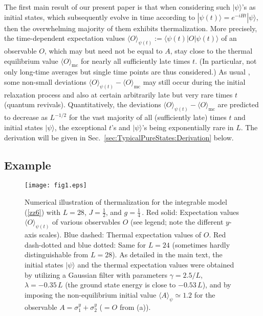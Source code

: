 \documentclass[twocolumn,aps,prb,floatfix,superscriptaddress]{revtex4-2}
\newcommand{\<}{\left\langle}	%
\renewcommand{\>}{\right\rangle}	%
\newcommand{\Omc}{\langle O\rangle_{\!\mathrm{mc}}}
\begin{document}
The first main result of our present paper is that
when considering such $|\psi\rangle$'s as initial 
states, which subsequently evolve in time according to 
$|\psi(t)\rangle=e^{-iHt}|\psi\rangle$,
then the overwhelming majority of them exhibits thermalization.
More precisely,
the
time-dependent expectation values 
$\langle O\rangle_{\!\psi(t)}:=\langle\psi (t)|O|\psi(t)\rangle$
of an observable $O$,
which may but need not be equal to $A$, 
stay close to
the thermal equilibrium value
$\Omc$
for 
nearly all
sufficiently late times $t$.
(In particular, not only long-time averages
but single time points are thus considered.)
As usual \cite{dal16,gog16,mor18}, 
some non-small deviations
$\langle O\rangle_{\!\psi(t)}-\Omc$
may still occur during the initial relaxation process
and also at certain arbitrarily late but very rare times 
$t$ (quantum revivals).
Quantitatively, the
deviations $\langle O\rangle_{\!\psi(t)}-\Omc$ are 
predicted 
to decrease 
as $L^{-1/2}$
for the vast majority of 
all (sufficiently late) times $t$ and initial states 
$|\psi\rangle$,
the exceptional $t$'s and $|\psi\rangle$'s being
exponentially rare in $L$.
The derivation will be given in Sec.~\ref{sec:TypicalPureStates:Derivation} below.

\subsection{Example}

\begin{figure}
\texttt{[image: fig1.eps]}
\caption{Numerical illustration of thermalization
for the integrable model (\ref{zz6}) with 
$L=28$,
$J=\frac{1}{2}$, and $g=\frac{1}{4}\,$.
Red solid: Expectation values $\langle O\rangle_{\!\psi(t)}$ 
of various observables $O$ (see legend;
note the different $y$-axis scales).
Blue dashed: Thermal expectation values of $O$.
Red dash-dotted and blue dotted: Same for $L=24$
(sometimes hardly distinguishable from $L=28$).
As detailed in the main text,
the initial states $|\psi \rangle$ and the thermal expectation 
values were obtained by utilizing a Gaussian filter with parameters 
$\gamma =2.5/L$, $\lambda=-0.35\,L$
(the ground state energy 
is close to $-0.53\, L$),
and by imposing the non-equilibrium initial value
$\langle A\rangle_{\!\psi} \simeq 1.2$
for the observable $A=\sigma^y_1 + \sigma^y_2$ ($=O$ from (a)).}
\label{fig1}
\end{figure}
\end{document}
